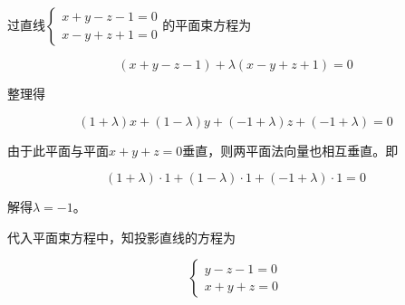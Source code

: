\documentclass[12pt, a4paper]{article}
\numberwithin{equation}{section}
\begin{document}
    过直线$\left\{\begin{array}{l}x+y-z-1=0 \\ x-y+z+1=0\end{array}\right.$的平面束方程为

    $$
        (x+y-z-1)+\lambda(x-y+z+1)=0
    $$

    整理得

    $$
        (1+\lambda) x+(1-\lambda) y+(-1+\lambda) z+(-1+\lambda)=0
    $$

    由于此平面与平面\(x+y+z=0\)垂直，则两平面法向量也相互垂直。即

    $$
        (1+\lambda) \cdot 1+(1-\lambda) \cdot 1+(-1+\lambda) \cdot 1=0
    $$

    解得\(\lambda=-1\)。

    代入平面束方程中，知投影直线的方程为

    $$
        \left\{\begin{array}{l}
        y-z-1=0 \\
        x+y+z=0
        \end{array}\right.
    $$
\end{document}

